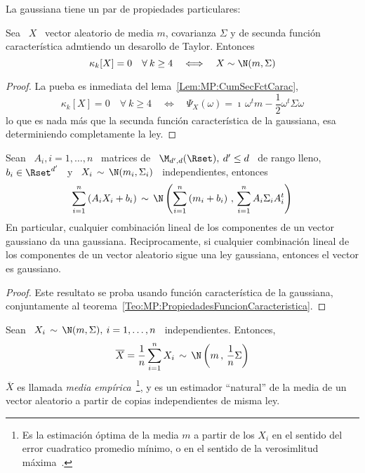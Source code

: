 La gaussiana tiene un par de propiedades particulares:
%
\begin{lema}
%
  Sea \  $X$ \ vector aleatorio de  media $m$, covarianza $\Sigma$  y de secunda
  funci\'on caracter\'istica admtiendo un desarollo de Taylor. Entonces
  \[
  \kappa_k[X] =  0 \quad \forall \: k  \ge 4 \quad \Longleftrightarrow  \quad X \sim
  \N(m,\Sigma)
  \]
\end{lema}
%
\begin{proof}
  La pueba es inmediata del lema~\ref{Lem:MP:CumSecFctCarac},
  \[
  \kappa_k[X]  =  0  \quad  \forall  \:  k \ge  4  \quad  \Longleftrightarrow  \quad
  \Psi_X(\omega) = \imath \, \omega^t m - \frac12 \omega^t \Sigma \omega
  \]
  lo que es nada m\'as que la secunda funci\'on caracter\'istica de la gaussiana,
  esa determiniendo completamente la ley.
\end{proof}
%
\begin{teorema}[Stabilidad]
\label{Teo:MP:StabilidadGaussiana}
%
  Sean \ $A_i , i = 1,\ldots,n$  \ matrices de \ $\M_{d',d}(\Rset), \: d' \le d$
  \ de rango lleno, $b_i \in \Rset^{d'}$ \ y \ $X_i \, \sim \, \N(m_i,\Sigma_i)$
  \ independientes, entonces
  \[
  \sum_{i=1}^n \left(  A_i X_i  + b_i \right)  \, \sim \,  \N\left( \sum_{i=1}^n
    \left( m_i + b_i \right) \, , \, \sum_{i=1}^n A_i \Sigma_i A_i^t \right)
  \]
  En particular, cualquier combinaci\'on lineal  de los componentes de un vector
  gaussiano da una gaussiana.  Reciprocamente, si cualquier combinaci\'on lineal
  de los componentes de un vector aleatorio sigue una ley gaussiana, entonces el
  vector es gaussiano.
\end{teorema}
%
\begin{proof}
  Este  resultato se proba  usando funci\'on  caracter\'istica de  la gaussiana,
  conjuntamente al teorema~\ref{Teo:MP:PropiedadesFuncionCaracteristica}.
\end{proof}
%
\begin{corolario}\label{Cor:MP:MediaEmpiricaGauss}
%
  Sean \ $X_i \, \sim \, \N(m,\Sigma), \: i = 1, \ldots , n$ \ independientes. Entonces,
  \[
  \overline{X} =  \frac{1}{n} \sum_{i=1}^n  X_i \,  \sim \, \N\left(  m \,  , \,
    \frac{1}{n} \Sigma \right)
  \]
  $\overline{X}$  es llamada {\em  media emp\'irica}~\footnote{Es  la estimaci\'on
    \'optima de  la media  $m$ a  partir de los  $X_i$ en  el sentido  del error
    cuadratico  promedio   m\'inimo,  o  en   el  sentido  de   la  verosimlitud
    m\'axima~\cite{Kay93, Rob07}.}, y es un estimador ``natural'' de la media de
  un vector aleatorio a partir de copias independientes de misma ley.
\end{corolario}
